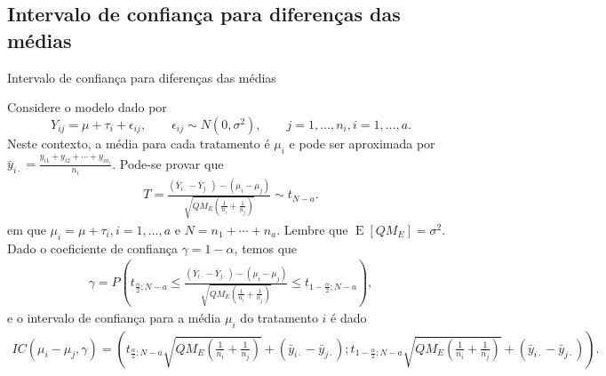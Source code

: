 \documentclass[8pt]{beamer}
\DeclareMathOperator{\espe}{E}
\begin{document}
\subsection{Intervalo de confiança para diferenças das médias}

\begin{frame}{Intervalo de confiança para diferenças das médias}

Considere o modelo dado por
$$Y_{ij} = \mu + \tau_i  + \epsilon_{ij}, \qquad \epsilon_{ij} \sim N(0, \sigma^2), \qquad j=1, \dots, n_i, i=1, \dots, a.$$
Neste contexto, a média para cada tratamento é $\mu_i$ e pode ser aproximada por $\bar{y}_{i\cdot} = \frac{y_{i1} + y_{i2} + \cdots + y_{in_i}}{n_i}$. Pode-se provar que
\begin{align*}
T = \frac{(\bar{Y}_{i\cdot} - \bar{Y}_{j\cdot}) - (\mu_i - \mu_j)}{\sqrt{QM_E\left(\frac{1}{n_i} + \frac{1}{n_j} \right)}} \sim t_{N - a}.
\end{align*}
em que $\mu_i=\mu+\tau_i,i =1, \dots, a$ e $N = n_1 + \cdots + n_a$. Lembre que $\espe\left[QM_E\right] = \sigma^2$. Dado o coeficiente de confiança $\gamma=1-\alpha$, temos que
\begin{align*}
\gamma = P\left( t_{\frac{\alpha}{2};N - a} \leq \frac{(\bar{Y}_{i\cdot} - \bar{Y}_{j\cdot}) - (\mu_i - \mu_j)}{\sqrt{QM_E\left(\frac{1}{n_i} + \frac{1}{n_j} \right)}} \leq t_{1-\frac{\alpha}{2};N - a}  \right),
\end{align*}
e o intervalo de confiança para a média $\mu_i$ do tratamento  $i$ é dado
\footnotesize
\begin{align*}
IC(\mu_i - \mu_j, \gamma) = \left( t_{\frac{\alpha}{2};N - a} \sqrt{QM_E\left(\frac{1}{n_i} + \frac{1}{n_j} \right)} + (\bar{y}_{i\cdot} - \bar{y}_{j\cdot}); t_{1-\frac{\alpha}{2};N - a} \sqrt{QM_E\left(\frac{1}{n_i} + \frac{1}{n_j} \right)} + (\bar{y}_{i\cdot} - \bar{y}_{j\cdot}) \right).
\end{align*}
\normalsize

\end{frame}
\end{document}
